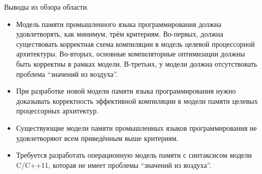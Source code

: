 
Выводы из обзора области.
\begin{itemize}
  \item Модель памяти промышленного языка программирования должна удовлетворять, как минимум, трём критериям.
    Во-первых, должна существовать корректная схема компиляции в модель целевой процессорной
    архитектуры.
    Во-вторых, основные компиляторные оптимизации должны быть корректны в рамках модели.
    В-третьих, у модели должна отсутствовать проблема ``значений из воздуха''.
  \item При разработке новой модели памяти языка программирования нужно доказывать корректность эффективной компиляции
     в модели памяти целевых процессорных архитектур.
  \item Существующие модели памяти промышленных языков программирования не удовлетворяют всем приведённым выше
    критериям.
  \item Требуется разработать операционную модель памяти с синтаксисом модели C/C++11, которая
    не имеет проблемы ``значений из воздуха''.
\end{itemize}

